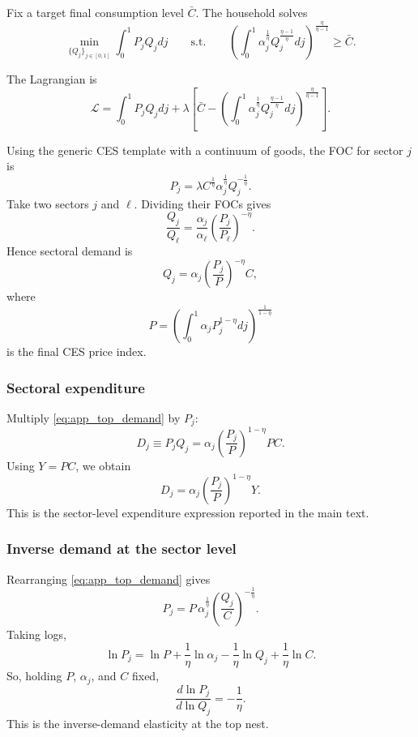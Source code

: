 Fix a target final consumption level $\bar{C}$. The household solves
\[
\min_{\{Q_j\}_{j \in [0,1]}}
\int_0^1 P_j Q_j dj
\qquad \text{s.t.} \qquad
\left(
\int_0^1
\alpha_j^{\frac{1}{\eta}} Q_j^{\frac{\eta-1}{\eta}} dj
\right)^{\frac{\eta}{\eta-1}}
\geq \bar{C}.
\]

The Lagrangian is
\[
\mathcal{L}
=
\int_0^1 P_j Q_j dj
+
\lambda
\left[
\bar{C}
-
\left(
\int_0^1
\alpha_j^{\frac{1}{\eta}} Q_j^{\frac{\eta-1}{\eta}} dj
\right)^{\frac{\eta}{\eta-1}}
\right].
\]

Using the generic CES template with a continuum of goods, the FOC for sector $j$ is
\begin{equation}
P_j = \lambda C^{\frac{1}{\eta}} \alpha_j^{\frac{1}{\eta}} Q_j^{-\frac{1}{\eta}}.
\label{eq:app_top_foc}
\end{equation}
Take two sectors $j$ and $\ell$. Dividing their FOCs gives
\[
\frac{Q_j}{Q_\ell}
=
\frac{\alpha_j}{\alpha_\ell}
\left( \frac{P_j}{P_\ell} \right)^{-\eta}.
\]
Hence sectoral demand is
\begin{equation}
Q_j = \alpha_j \left( \frac{P_j}{P} \right)^{-\eta} C,
\label{eq:app_top_demand}
\end{equation}
where
\begin{equation}
P =
\left(
\int_0^1 \alpha_j P_j^{1-\eta} dj
\right)^{\frac{1}{1-\eta}}
\label{eq:app_top_price_index}
\end{equation}
is the final CES price index.

\subsubsection{Sectoral expenditure}

Multiply \eqref{eq:app_top_demand} by $P_j$:
\[
D_j \equiv P_j Q_j = \alpha_j \left( \frac{P_j}{P} \right)^{1-\eta} P C.
\]
Using $Y = PC$, we obtain
\begin{equation}
D_j = \alpha_j \left( \frac{P_j}{P} \right)^{1-\eta} Y.
\label{eq:app_sector_expenditure}
\end{equation}
This is the sector-level expenditure expression reported in the main text.

\subsubsection{Inverse demand at the sector level}

Rearranging \eqref{eq:app_top_demand} gives
\begin{equation}
P_j = P \, \alpha_j^{\frac{1}{\eta}} \left( \frac{Q_j}{C} \right)^{-\frac{1}{\eta}}.
\label{eq:app_top_inverse}
\end{equation}
Taking logs,
\[
\ln P_j = \ln P + \frac{1}{\eta} \ln \alpha_j - \frac{1}{\eta} \ln Q_j + \frac{1}{\eta} \ln C.
\]
So, holding $P$, $\alpha_j$, and $C$ fixed,
\begin{equation}
\frac{d \ln P_j}{d \ln Q_j} = - \frac{1}{\eta}.
\label{eq:app_top_inverse_elasticity}
\end{equation}
This is the inverse-demand elasticity at the top nest.

